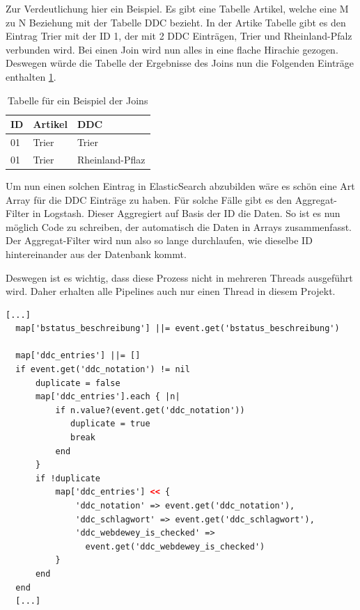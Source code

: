 Zur Verdeutlichung hier ein Beispiel.
Es gibt eine Tabelle Artikel, welche eine M zu N Beziehung mit der Tabelle DDC bezieht. In der Artike Tabelle gibt es den Eintrag Trier mit der ID 1, der mit 2 DDC Einträgen, Trier und Rheinland-Pfalz verbunden wird. Bei einen Join wird nun alles in eine flache Hirachie gezogen. Deswegen würde die Tabelle der Ergebnisse des Joins nun die Folgenden Einträge enthalten \ref{tbl:join}.

\begin{table} %
	\centering
		\begin{tabular}{l | l | l}
		    \textbf{ID} & \textbf{Artikel} & \textbf{DDC} \\
        \hline
        01 & Trier & Trier \\
        01 & Trier & Rheinland-Pflaz  \\
		\end{tabular}
    \caption{Tabelle für ein Beispiel der Joins}
    \label{tbl:join}
\end{table}

Um nun einen solchen Eintrag in ElasticSearch abzubilden wäre es schön eine Art Array für die DDC Einträge zu haben. Für solche Fälle gibt es den Aggregat-Filter in Logstash. Dieser Aggregiert auf Basis der ID die Daten. So ist es nun möglich Code zu schreiben, der automatisch die Daten in Arrays zusammenfasst. Der Aggregat-Filter wird nun also so lange durchlaufen, wie dieselbe ID hintereinander aus der Datenbank kommt. 

Deswegen ist es wichtig, dass diese Prozess nicht in mehreren Threads ausgeführt wird. Daher erhalten alle Pipelines auch nur einen Thread in diesem Projekt.


\begin{lstlisting}[language=XML, frame=single, label={lst:fronendConf}] 
  [...]
  map['bstatus_beschreibung'] ||= event.get('bstatus_beschreibung')

  map['ddc_entries'] ||= []
  if event.get('ddc_notation') != nil
      duplicate = false
      map['ddc_entries'].each { |n|
          if n.value?(event.get('ddc_notation'))
             duplicate = true
             break
          end
      }
      if !duplicate
          map['ddc_entries'] << {
              'ddc_notation' => event.get('ddc_notation'),
              'ddc_schlagwort' => event.get('ddc_schlagwort'),
              'ddc_webdewey_is_checked' => 
                event.get('ddc_webdewey_is_checked')
          }
      end
  end
  [...]
\end{lstlisting}

